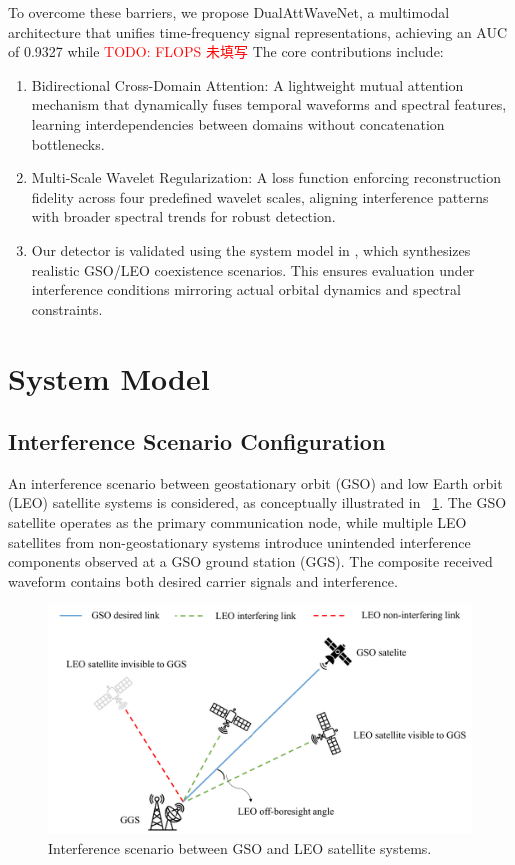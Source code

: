 \documentclass[10pt, conference]{IEEEtran}
\newcommand{\todo}[1]{\textcolor{red}{TODO: #1}}
\begin{document}
To overcome these barriers, we propose DualAttWaveNet, a multimodal architecture that unifies time-frequency signal representations, achieving an AUC of 0.9327 while \todo{FLOPS 未填写} The core contributions include:

\begin{enumerate}
    \item Bidirectional Cross-Domain Attention: A lightweight mutual attention mechanism that dynamically fuses temporal waveforms and spectral features, learning interdependencies between domains without concatenation bottlenecks.
    \item Multi-Scale Wavelet Regularization: A loss function enforcing reconstruction fidelity across four predefined wavelet scales, aligning interference patterns with broader spectral trends for robust detection.
    \item Our detector is validated using the system model in \cite{saifaldawlaGenAIBasedModelsNGSO2024}, which synthesizes realistic GSO/LEO coexistence scenarios. This ensures evaluation under interference conditions mirroring actual orbital dynamics and spectral constraints.
\end{enumerate}

\section{System Model}
\label{sec:system_model}

\subsection{Interference Scenario Configuration}
An interference scenario between geostationary orbit (GSO) and low Earth orbit (LEO) satellite systems is considered, as conceptually illustrated in \figurename~\ref{fig:interference-scenario}. The GSO satellite operates as the primary communication node, while multiple LEO satellites from non-geostationary systems introduce unintended interference components observed at a GSO ground station (GGS). The composite received waveform contains both desired carrier signals and interference.

\begin{figure}[tb]
    \centering
    \includegraphics[width=\linewidth]{system-model.pdf}
    \caption{Interference scenario between GSO and LEO satellite systems.}
    \label{fig:interference-scenario}
\end{figure}
\end{document}
